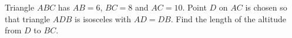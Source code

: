 Triangle $ABC$ has $AB=6$, $BC=8$ and $AC=10$. Point $D$ on $AC$ is chosen so that triangle $ADB$ is isosceles with $AD=DB$. Find the length of the altitude from $D$ to $BC$.
